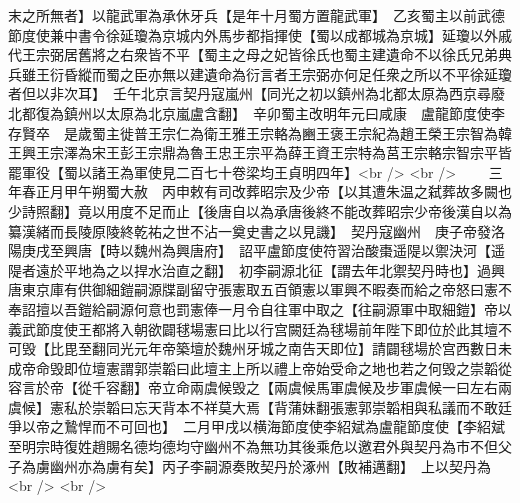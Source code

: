 末之所無者】以龍武軍為承休牙兵【是年十月蜀方置龍武軍】　乙亥蜀主以前武德節度使兼中書令徐延瓊為京城内外馬步都指揮使【蜀以成都城為京城】延瓊以外戚代王宗弼居舊將之右衆皆不平【蜀主之母之妃皆徐氏也蜀主建遺命不以徐氏兄弟典兵雖王衍昏縱而蜀之臣亦無以建遺命為衍言者王宗弼亦何足任衆之所以不平徐延瓊者但以非次耳】　壬午北京言契丹寇嵐州【同光之初以鎮州為北都太原為西京尋廢北都復為鎮州以太原為北京嵐盧含翻】　辛卯蜀主改明年元曰咸康　盧龍節度使李存賢卒　是歲蜀主徙普王宗仁為衛王雅王宗輅為豳王褒王宗紀為趙王榮王宗智為韓王興王宗澤為宋王彭王宗鼎為魯王忠王宗平為薛王資王宗特為莒王宗輅宗智宗平皆罷軍役【蜀以諸王為軍使見二百七十卷梁均王貞明四年】<br />
<br />
　　三年春正月甲午朔蜀大赦　丙申敕有司改葬昭宗及少帝【以其遭朱温之弑葬故多闕也少詩照翻】竟以用度不足而止【後唐自以為承唐後終不能改葬昭宗少帝後漢自以為纂漢緒而長陵原陵終乾祐之世不沾一奠史書之以見譏】　契丹寇幽州　庚子帝發洛陽庚戌至興唐【時以魏州為興唐府】　詔平盧節度使符習治酸棗遥隄以禦決河【遥隄者遠於平地為之以捍水治直之翻】　初李嗣源北征【謂去年北禦契丹時也】過興唐東京庫有供御細鎧嗣源牒副留守張憲取五百領憲以軍興不暇奏而給之帝怒曰憲不奉詔擅以吾鎧給嗣源何意也罰憲俸一月令自往軍中取之【往嗣源軍中取細鎧】帝以義武節度使王都將入朝欲闢毬場憲曰比以行宫闕廷為毬場前年陛下即位於此其壇不可毁【比毘至翻同光元年帝築壇於魏州牙城之南告天即位】請闢毬場於宫西數日未成帝命毁即位壇憲謂郭崇韜曰此壇主上所以禮上帝始受命之地也若之何毁之崇韜從容言於帝【從千容翻】帝立命兩虞候毁之【兩虞候馬軍虞候及步軍虞候一曰左右兩虞候】憲私於崇韜曰忘天背本不祥莫大焉【背蒲妹翻張憲郭崇韜相與私議而不敢廷爭以帝之鷙悍而不可回也】　二月甲戌以横海節度使李紹斌為盧龍節度使【李紹斌至明宗時復姓趙賜名德均德均守幽州不為無功其後乘危以邀君外與契丹為市不但父子為虜幽州亦為虜有矣】丙子李嗣源奏敗契丹於涿州【敗補邁翻】　上以契丹為<br />
<br />
